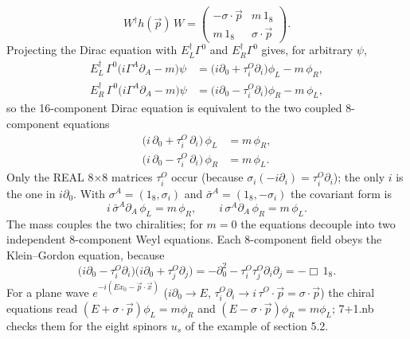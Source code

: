 \documentclass[10pt,a4paper]{article}
\begin{document}
\begin{equation*}
W^\dagger h(\vec p)\,W=\begin{pmatrix}-\sigma\cdot\vec p&m\,1_8\\m\,1_8&\sigma\cdot\vec p\end{pmatrix}.
\end{equation*}
Projecting the Dirac equation with $E_L^\dagger\Gamma^0$ and $E_R^\dagger\Gamma^0$ gives, for arbitrary $\psi$,
\begin{align*}
E_L^\dagger\,\Gamma^0\big(i\Gamma^A\partial_A-m\big)\psi&=\big(i\partial_0+\tau^{O}_i\partial_i\big)\phi_L-m\,\phi_R, \\
E_R^\dagger\,\Gamma^0\big(i\Gamma^A\partial_A-m\big)\psi&=\big(i\partial_0-\tau^{O}_i\partial_i\big)\phi_R-m\,\phi_L,
\end{align*}
so the 16-component Dirac equation is equivalent to the two coupled 8-component equations
\begin{align*}
\big(i\,\partial_0+\tau^{O}_i\,\partial_i\big)\,\phi_L&=m\,\phi_R, \\
\big(i\,\partial_0-\tau^{O}_i\,\partial_i\big)\,\phi_R&=m\,\phi_L .
\end{align*}
Only the REAL 8×8 matrices $\tau^{O}_i$ occur (because $\sigma_i(-i\partial_i)=\tau^{O}_i\partial_i$); the only $i$ is the one in $i\partial_0$. With $\sigma^A=(1_8,\sigma_i)$ and $\bar\sigma^A=(1_8,-\sigma_i)$ the covariant form is
\begin{equation*}
i\,\bar\sigma^A\partial_A\,\phi_L=m\,\phi_R,\qquad i\,\sigma^A\partial_A\,\phi_R=m\,\phi_L .
\end{equation*}
The mass couples the two chiralities; for $m=0$ the equations decouple into two independent 8-component Weyl equations. Each 8-component field obeys the Klein–Gordon equation, because
\begin{equation*}
\big(i\partial_0-\tau^{O}_i\partial_i\big)\big(i\partial_0+\tau^{O}_j\partial_j\big)=-\partial_0^2-\tau^{O}_i\tau^{O}_j\partial_i\partial_j=-\Box\,1_8 .
\end{equation*}
For a plane wave $e^{-i(Ex_0-\vec p\cdot\vec x)}$ ($i\partial_0\to E$, $\tau^{O}_i\partial_i\to i\,\tau^{O}\cdot\vec p=\sigma\cdot\vec p$) the chiral equations read $(E+\sigma\cdot\vec p)\phi_L=m\phi_R$ and $(E-\sigma\cdot\vec p)\phi_R=m\phi_L$; 7+1.nb checks them for the eight spinors $u_s$ of the example of section 5.2.
\end{document}
